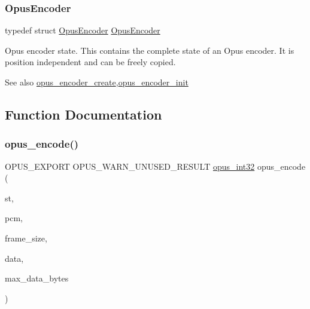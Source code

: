 \subsubsection{\texorpdfstring{Opus\+Encoder}{OpusEncoder}}
{\footnotesize\ttfamily typedef struct \hyperlink{group__opus__encoder_gaf461a3ef2f10c2fe8b994a176f06c9bd}{Opus\+Encoder} \hyperlink{group__opus__encoder_gaf461a3ef2f10c2fe8b994a176f06c9bd}{Opus\+Encoder}}

Opus encoder state. This contains the complete state of an Opus encoder. It is position independent and can be freely copied. \begin{DoxySeeAlso}{See also}
\hyperlink{group__opus__encoder_ga8a145618886fed2d6fbc79a4071a939d}{opus\+\_\+encoder\+\_\+create},\hyperlink{group__opus__encoder_ga363e90db0f434b2d8fde7dcf989270b1}{opus\+\_\+encoder\+\_\+init} 
\end{DoxySeeAlso}


\subsection{Function Documentation}
\mbox{\label{group__opus__encoder_gabbb51305050b64614329637d6eff777c}} 
\subsubsection{\texorpdfstring{opus\+\_\+encode()}{opus\_encode()}}
{\footnotesize\ttfamily O\+P\+U\+S\+\_\+\+E\+X\+P\+O\+RT O\+P\+U\+S\+\_\+\+W\+A\+R\+N\+\_\+\+U\+N\+U\+S\+E\+D\+\_\+\+R\+E\+S\+U\+LT \hyperlink{opus__types_8h_aa4d309d6f80b99dbabebc8f98879ab9a}{opus\+\_\+int32} opus\+\_\+encode (\begin{DoxyParamCaption}\item[{\hyperlink{group__opus__encoder_gaf461a3ef2f10c2fe8b994a176f06c9bd}{Opus\+Encoder} $\ast$}]{st,  }\item[{\hyperlink{zconf_8h_a2c212835823e3c54a8ab6d95c652660e}{const} \hyperlink{opus__types_8h_acc9ed7cf60479eb81f9648c6ec27dc26}{opus\+\_\+int16} $\ast$}]{pcm,  }\item[{int}]{frame\+\_\+size,  }\item[{unsigned char $\ast$}]{data,  }\item[{\hyperlink{opus__types_8h_aa4d309d6f80b99dbabebc8f98879ab9a}{opus\+\_\+int32}}]{max\+\_\+data\+\_\+bytes }\end{DoxyParamCaption})}

